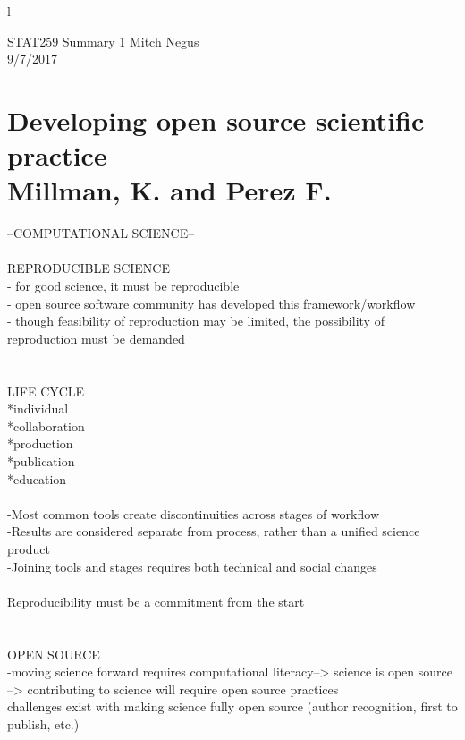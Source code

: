 l\documentclass{report}
\begin{document}
\thispagestyle{empty}
\sffamily

\large {STAT259 Summary {1} \hfill Mitch Negus\\
		\hspace*{\fill} 9/7/2017\\ }
\section*{\textsf{Developing open source scientific practice \\ \normalsize Millman, K. and Perez F.}}

--COMPUTATIONAL SCIENCE--\\
\-\\
REPRODUCIBLE SCIENCE\\
- for good science, it must be reproducible\\
- open source software community has developed this framework/workflow\\
- though feasibility of reproduction may be limited, the possibility of reproduction must be demanded\\
\-\\
\-\\
LIFE CYCLE\\
*individual\\
*collaboration\\
*production\\
*publication\\
*education\\
\-\\
-Most common tools create discontinuities across stages of workflow\\
-Results are considered separate from process, rather than a unified science product\\
-Joining tools and stages requires both technical and social changes\\
\-\\
Reproducibility must be a commitment from the start\\
\-\\
\-\\
OPEN SOURCE\\
-moving science forward requires computational literacy--> science is open source --> contributing to science will require open source practices\\
challenges exist with making science fully open source (author recognition, first to publish, etc.)\\
\-\\
\end{document}
